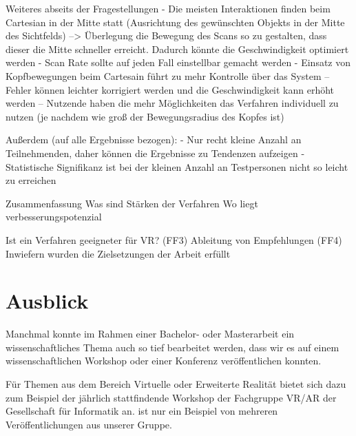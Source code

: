 Weiteres abseits der Fragestellungen 
-	Die meisten Interaktionen finden beim Cartesian in der Mitte statt (Ausrichtung des gewünschten Objekts in der Mitte des Sichtfelds) --> Überlegung die Bewegung des Scans so zu gestalten, dass dieser die Mitte schneller erreicht. Dadurch könnte die Geschwindigkeit optimiert werden 
-	Scan Rate sollte auf jeden Fall einstellbar gemacht werden 
-	Einsatz von Kopfbewegungen beim Cartesain führt zu mehr Kontrolle über das System – Fehler können leichter korrigiert werden und die Geschwindigkeit kann erhöht werden – Nutzende haben die mehr Möglichkeiten das Verfahren individuell zu nutzen (je nachdem wie groß der Bewegungsradius des Kopfes ist)

Außerdem (auf alle Ergebnisse bezogen):
-	Nur recht kleine Anzahl an Teilnehmenden, daher können die Ergebnisse zu Tendenzen aufzeigen 
-	Statistische Signifikanz ist bei der kleinen Anzahl an Testpersonen nicht so leicht zu erreichen 

Zusammenfassung 
Was sind Stärken der Verfahren
Wo liegt verbesserungspotenzial 

Ist ein Verfahren geeigneter für VR? (FF3) 
Ableitung von Empfehlungen (FF4) 
Inwiefern wurden die Zielsetzungen der Arbeit erfüllt 


\section{Ausblick}

Manchmal konnte im Rahmen einer Bachelor- oder Masterarbeit ein
wissenschaftliches Thema auch so tief bearbeitet werden, dass wir es auf einem
wissenschaftlichen Workshop oder einer Konferenz veröffentlichen konnten.

Für Themen aus dem Bereich Virtuelle oder Erweiterte Realität bietet sich dazu
zum Beispiel der jährlich stattfindende Workshop der Fachgruppe VR/AR der
Gesellschaft für Informatik an. \citet{Bluhm:Sonar:2009} ist nur ein Beispiel
von mehreren Veröffentlichungen aus unserer Gruppe.




